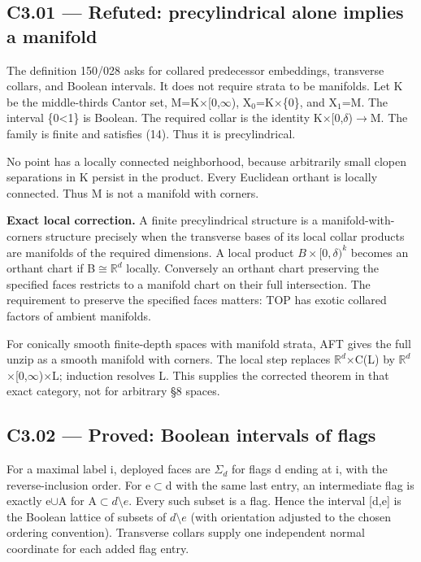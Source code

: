 \subsection{C3.01 --- Refuted: precylindrical alone implies a manifold}\label{c3.01-refuted-precylindrical-alone-implies-a-manifold}

The definition 150/028 asks for collared predecessor embeddings, transverse collars, and Boolean intervals. It does not require strata to be manifolds. Let K be the middle-thirds Cantor set, M=K\ensuremath{\times}{[}0,\ensuremath{\infty}), X\ensuremath{{}_{0}}=K\ensuremath{\times}\{0\}, and X\ensuremath{{}_{1}}=M. The interval \{0\textless1\} is Boolean. The required collar is the identity K\ensuremath{\times}{[}0,\ensuremath{\delta})\ensuremath{\to}M. The family is finite and satisfies (14). Thus it is precylindrical.

No point has a locally connected neighborhood, because arbitrarily small clopen separations in K persist in the product. Every Euclidean orthant is locally connected. Thus M is not a manifold with corners.

\textbf{Exact local correction.} A finite precylindrical structure is a manifold-with-corners structure precisely when the transverse bases of its local collar products are manifolds of the required dimensions. A local product \(B\times[0,\delta)^k\) becomes an orthant chart if B\ensuremath{\cong}\(\mathbb R^d\) locally. Conversely an orthant chart preserving the specified faces restricts to a manifold chart on their full intersection. The requirement to preserve the specified faces matters: TOP has exotic collared factors of ambient manifolds.

For conically smooth finite-depth spaces with manifold strata, AFT \cite[Theorem 7.3.8]{C_AFT} gives the full unzip as a smooth manifold with corners. The local step replaces \(\mathbb R^d\)\ensuremath{\times}C(L) by \(\mathbb R^d\)\ensuremath{\times}{[}0,\ensuremath{\infty})\ensuremath{\times}L; induction resolves L. This supplies the corrected theorem in that exact category, not for arbitrary \S{}8 spaces.

\subsection{C3.02 --- Proved: Boolean intervals of flags}\label{c3.02-proved-boolean-intervals-of-flags}

For a maximal label i, deployed faces are \(\Sigma_d\) for flags d ending at i, with the reverse-inclusion order. For e\ensuremath{\subset}d with the same last entry, an intermediate flag is exactly e\ensuremath{\cup}A for A\ensuremath{\subset}\(d\setminus e\). Every such subset is a flag. Hence the interval {[}d,e{]} is the Boolean lattice of subsets of \(d\setminus e\) (with orientation adjusted to the chosen ordering convention). Transverse collars supply one independent normal coordinate for each added flag entry.

